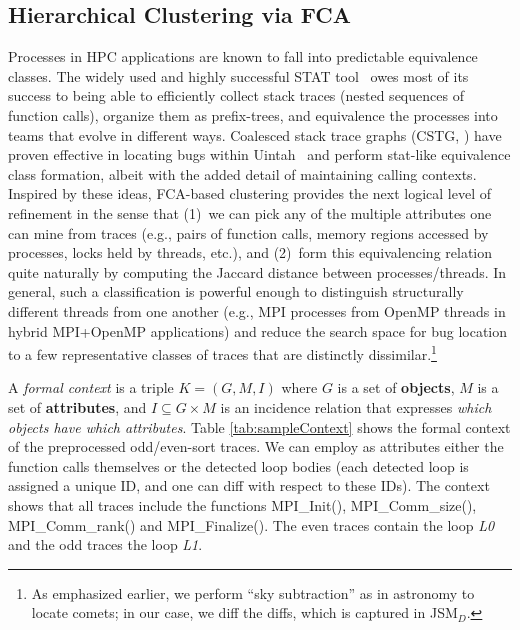 \subsection{Hierarchical Clustering via FCA}
Processes in HPC applications are known to fall into predictable equivalence classes.
%
The widely used and highly successful STAT tool~\cite{stat} owes most of its
success to being able to efficiently collect stack traces (nested sequences of function
calls), organize them as prefix-trees, and equivalence the processes into teams that
evolve in different ways.
%
Coalesced stack trace graphs (CSTG, \cite{cstg}) have proven effective in
locating bugs within Uintah~\cite{uintah} and perform stat-like equivalence class formation,
albeit with the added detail of maintaining calling contexts.
%
Inspired by these ideas, FCA-based clustering provides the next logical level of refinement
in the sense that (1)~we can pick any of the multiple attributes one can mine from traces (e.g.,
pairs of function calls, memory regions accessed by processes, locks held by threads, etc.), and (2)~form this equivalencing relation quite naturally by computing the Jaccard distance between processes/threads.
%
In general,
such a classification is powerful enough to
distinguish structurally different threads from one another
(e.g., MPI processes from OpenMP threads in hybrid MPI+OpenMP applications)
and reduce the search space for bug location to a few representative classes of traces that
are distinctly dissimilar.\footnote{As emphasized earlier, we perform ``sky subtraction'' as
  in astronomy to locate comets; in our case, we diff the diffs, which is
  captured in JSM$_{D}$.}

A \textit{formal context} is a triple $K = (G, M, I)$
where $G$ is a set of \textbf{objects},
$M$ is a set of \textbf{attributes},
and $I \subseteq G \times M$ is an incidence relation that expresses
\textit{which objects have which attributes}.
Table \ref{tab:sampleContext} shows the formal context of the preprocessed odd/even-sort traces.
%
We can employ as attributes either the function calls themselves or the detected loop bodies
(each detected loop is assigned a unique ID, and one can diff with respect to these IDs).
%
The context shows that all traces include the functions MPI\_Init(),
MPI\_Comm\_size(), MPI\_Comm\_rank() and MPI\_Finalize().
The even traces contain the loop \textit{L0} and the odd traces the loop \textit{L1}.
%

% 

